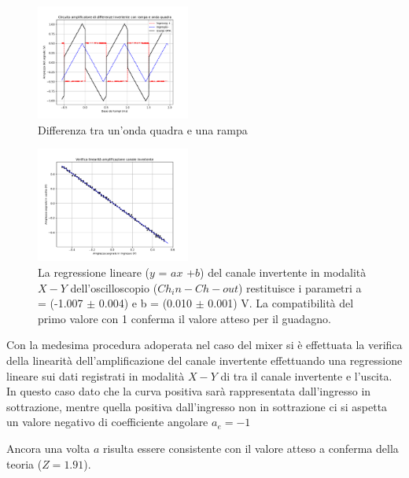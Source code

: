 \documentclass[journal]{IEEEtran}
\begin{document}
\begin{figure}[H]%
\begin {center}
\includegraphics[width=0.45\textwidth]{analysis/output/OPA_diff_squareramp.pdf}
\caption{Differenza tra un'onda quadra e una rampa}
\label{fig:diff_squareramp}
\end {center}
\end{figure}

\begin{figure}[H]%
\begin{center}
\includegraphics[width=0.45\textwidth]{analysis/output/OPA-linfit-inv.pdf}
\caption{La regressione lineare ($y$ = $ax$ +$b$) del canale invertente in modalità $X-Y$ dell'oscilloscopio ($Ch_in-Ch-out$) restituisce i parametri a = (-1.007 $\pm$ 0.004) e b = (0.010 $\pm$ 0.001) V. La compatibilità del primo valore con 1 conferma il valore atteso per il guadagno.}
\label{fig:lin-inv}
\end{center}
\end{figure}


Con la medesima procedura adoperata nel caso del mixer si è effettuata la verifica della linearità dell'amplificazione del canale invertente effettuando una regressione lineare sui dati registrati in modalità $X-Y$ di tra il canale invertente e l'uscita.
In questo caso dato che la curva positiva sarà rappresentata dall'ingresso in sottrazione, mentre quella positiva dall'ingresso non in sottrazione ci si aspetta un valore negativo di coefficiente angolare $a_e = -1$

Ancora una volta $a$ risulta essere consistente con il valore atteso a conferma della teoria ($Z=1.91$).
\end{document}
